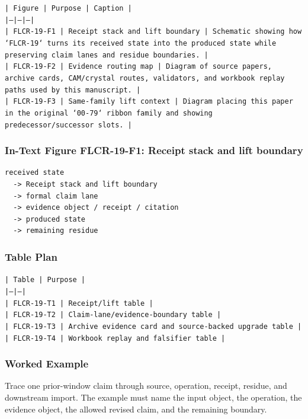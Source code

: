 \documentclass[11pt]{article}
\begin{document}
\noindent\texttt{| Figure | Purpose | Caption |}\\
\noindent\texttt{|---|---|---|}\\
\noindent\texttt{| FLCR-19-F1 | Receipt stack and lift boundary | Schematic showing how `FLCR-19` turns its received state into the produced state while preserving claim lanes and residue boundaries. |}\\
\noindent\texttt{| FLCR-19-F2 | Evidence routing map | Diagram of source papers, archive cards, CAM/crystal routes, validators, and workbook replay paths used by this manuscript. |}\\
\noindent\texttt{| FLCR-19-F3 | Same-family lift context | Diagram placing this paper in the original `00-79` ribbon family and showing predecessor/successor slots. |}\\

\subsubsection*{In-Text Figure FLCR-19-F1: Receipt stack and lift boundary}

\begin{verbatim}
received state
  -> Receipt stack and lift boundary
  -> formal claim lane
  -> evidence object / receipt / citation
  -> produced state
  -> remaining residue
\end{verbatim}

\subsubsection*{Table Plan}

\noindent\texttt{| Table | Purpose |}\\
\noindent\texttt{|---|---|}\\
\noindent\texttt{| FLCR-19-T1 | Receipt/lift table |}\\
\noindent\texttt{| FLCR-19-T2 | Claim-lane/evidence-boundary table |}\\
\noindent\texttt{| FLCR-19-T3 | Archive evidence card and source-backed upgrade table |}\\
\noindent\texttt{| FLCR-19-T4 | Workbook replay and falsifier table |}\\

\subsubsection*{Worked Example}

Trace one prior-window claim through source, operation, receipt, residue, and downstream import. The example must name the input object, the operation,
the evidence object, the allowed revised claim, and the remaining boundary.
\end{document}
